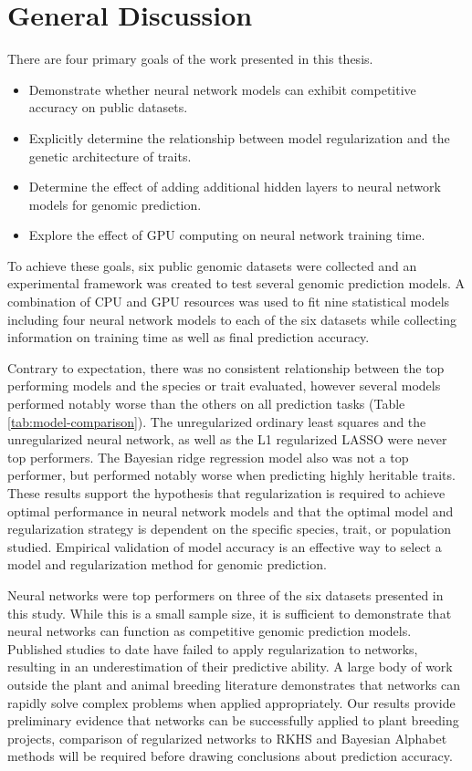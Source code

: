 \section{General Discussion}

There are four primary goals of the work presented in this thesis.

\begin{itemize}
    \item Demonstrate whether neural network models can exhibit competitive 
          accuracy on public datasets.
    \item Explicitly determine the relationship between model regularization and 
          the genetic architecture of traits. 
    \item Determine the effect of adding additional hidden layers to neural 
          network models for genomic prediction.
    \item Explore the effect of GPU computing on neural network training time.
\end{itemize}

To achieve these goals, six public genomic datasets were collected and an
experimental framework was created to test several genomic prediction models.
A combination of CPU and GPU resources was used to fit nine statistical 
models including four neural network models to each of the six datasets 
while collecting information on training time as well as final 
prediction accuracy. 

Contrary to expectation, there was no consistent relationship between
the top performing models and the species or trait evaluated, however
several models performed notably worse than the others on all prediction
tasks (Table \ref{tab:model-comparison}). The unregularized ordinary
least squares and the unregularized neural network, as well as the L1
regularized LASSO were never top performers. The Bayesian ridge
regression model also was not a top performer, but performed notably
worse when predicting highly heritable traits. These results support the
hypothesis that regularization is required to achieve optimal performance
in neural network models and that the optimal model and regularization
strategy is dependent on the specific species, trait, or population
studied. Empirical validation of model accuracy is an effective way to 
select a model and regularization method for genomic prediction.

Neural networks were top performers on three of the six datasets
presented in this study. While this is a small sample size, it is
sufficient to demonstrate that neural networks can function as 
competitive genomic prediction models. Published studies to date have failed 
to apply regularization to networks, resulting in an underestimation 
of their predictive ability. A large body of work outside the plant 
and animal breeding literature demonstrates that networks can 
rapidly solve complex problems when applied appropriately.
Our results provide preliminary evidence that networks can be successfully
applied to plant breeding projects, comparison of regularized networks 
to RKHS and Bayesian Alphabet methods will be required before drawing conclusions about 
prediction accuracy.

